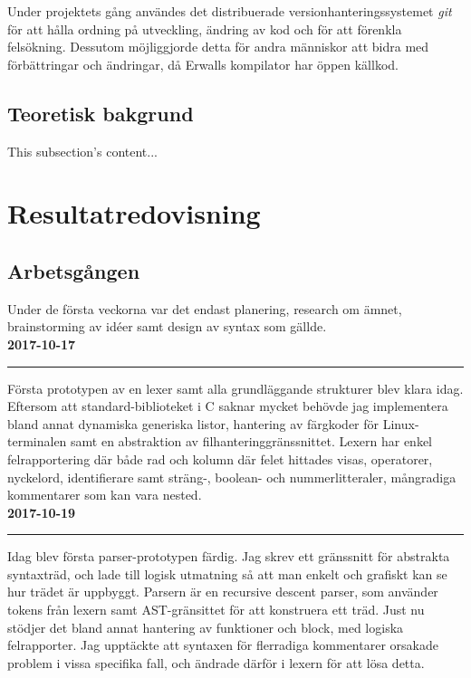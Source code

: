\documentclass{theme}
\begin{document}
Under projektets gång användes det distribuerade versionhanteringssystemet 
\textit{git} för att hålla ordning på utveckling, ändring av kod och för att 
förenkla felsökning. Dessutom möjliggjorde detta för andra människor att bidra
med förbättringar och ändringar, då Erwalls kompilator har öppen källkod. 

\subsection{Teoretisk bakgrund}
This subsection's content...

\section{Resultatredovisning}

\subsection{Arbetsgången}

Under de första veckorna var det endast planering, research om ämnet, 
brainstorming av idéer samt design av syntax som gällde. \\

\noindent\textbf{2017-10-17}\\
\noindent\rule{\textwidth}{1pt}

\noindent 
Första prototypen av en lexer samt alla grundläggande strukturer blev klara 
idag. Eftersom att standard-biblioteket i C saknar mycket behövde jag 
implementera bland annat dynamiska generiska listor, hantering av färgkoder
för Linux-terminalen samt en abstraktion av filhanteringgränssnittet. Lexern 
har enkel felrapportering där både rad och kolumn där felet hittades visas, 
operatorer, nyckelord, identifierare samt sträng-, boolean- och 
nummerlitteraler, mångradiga kommentarer som kan vara nested. \\

\noindent\textbf{2017-10-19}\\
\noindent\rule{\textwidth}{1pt}

\noindent 
Idag blev första parser-prototypen färdig. Jag skrev ett gränssnitt för 
abstrakta syntaxträd, och lade till logisk utmatning så att man enkelt och 
grafiskt kan se hur trädet är uppbyggt. Parsern är en recursive descent parser, 
som använder tokens från lexern samt AST-gränsittet för att konstruera ett träd.
Just nu stödjer det bland annat hantering av funktioner och block, med logiska 
felrapporter. Jag upptäckte att syntaxen för flerradiga kommentarer orsakade 
problem i vissa specifika fall, och ändrade därför i lexern för att lösa detta.
\\
\end{document}
